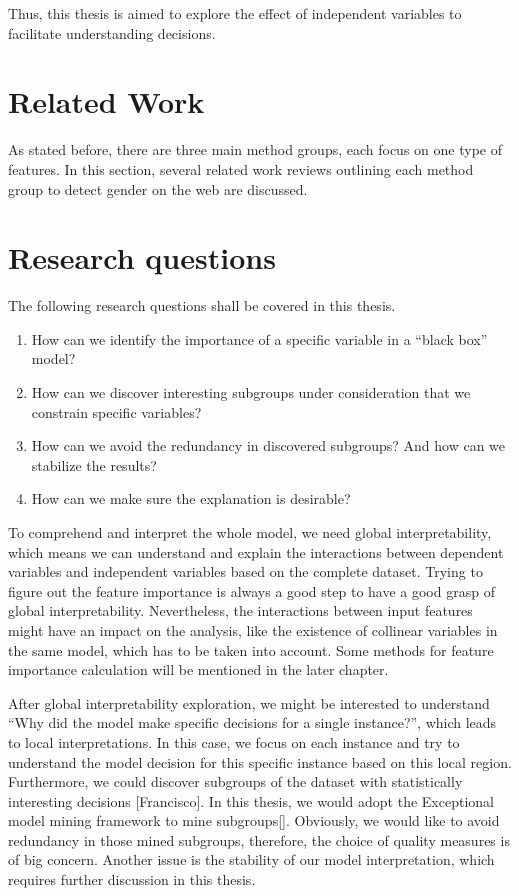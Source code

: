 \documentclass[runningheads]{llncs}
\begin{document}
	Thus, this thesis is aimed to explore the effect of independent variables to facilitate understanding decisions. 
	
	
	\section{Related Work}
	
	As stated before, there are three main method groups, each focus on one type of features. In this section, several related work reviews outlining each method group to detect gender on the web are discussed. 
	
	\section{Research questions}
	
	The following research questions shall be covered in this thesis. 
	
	\begin{enumerate}
		\item How can we identify the importance of a specific variable in a “black box” model?
		\item How can we discover interesting subgroups under consideration that we constrain specific variables?
		\item How can we avoid the redundancy in discovered subgroups? And how can we stabilize the results?
		\item How can we make sure the explanation is desirable?
	\end{enumerate}
	
	To comprehend and interpret the whole model, we need global interpretability, which means we can understand and explain the interactions between dependent variables and independent variables based on the complete dataset. Trying to figure out the feature importance is always a good step to have a good grasp of global interpretability. Nevertheless, the interactions between input features might have an impact on the analysis, like the existence of collinear variables in the same model, which has to be taken into account. Some methods for feature importance calculation will be mentioned in the later chapter. 
	
	After global interpretability exploration, we might be interested to understand “Why did the model make specific decisions for a single instance?”, which leads to local interpretations. In this case, we focus on each instance and try to understand the model decision for this specific instance based on this local region. Furthermore, we could discover subgroups of the dataset with statistically interesting decisions [Francisco]. In this thesis, we would adopt the Exceptional model mining framework to mine subgroups[]. Obviously, we would like to avoid redundancy in those mined subgroups, therefore, the choice of quality measures is of big concern. Another issue is the stability of our model interpretation, which requires further discussion in this thesis.
	
\end{document}
